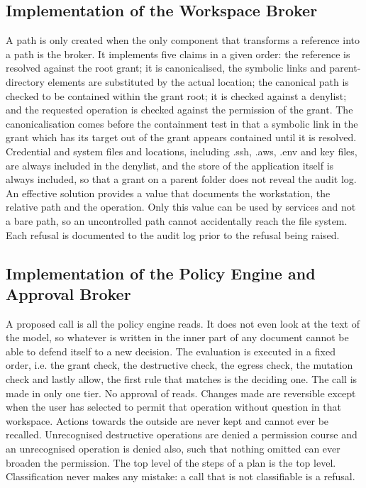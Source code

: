 \documentclass{FastFyp}
\begin{document}
\subsection{Implementation of the Workspace Broker}
A path is only created when the only component that transforms a reference into a path is the broker. It implements five claims in a given order: the reference is resolved against the root grant; it is canonicalised, the symbolic links and parent-directory elements are substituted by the actual location; the canonical path is checked to be contained within the grant root; it is checked against a denylist; and the requested operation is checked against the permission of the grant. The canonicalisation comes before the containment test in that a symbolic link in the grant which has its target out of the grant appears contained until it is resolved. Credential and system files and locations, including .ssh, .aws, .env and key files, are always included in the denylist, and the store of the application itself is always included, so that a grant on a parent folder does not reveal the audit log. An effective solution provides a value that documents the workstation, the relative path and the operation. Only this value can be used by services and not a bare path, so an uncontrolled path cannot accidentally reach the file system. Each refusal is documented to the audit log prior to the refusal being raised.


\subsection{Implementation of the Policy Engine and Approval Broker}
A proposed call is all the policy engine reads. It does not even look at the text of the model, so whatever is written in the inner part of any document cannot be able to defend itself to a new decision. The evaluation is executed in a fixed order, i.e. the grant check, the destructive check, the egress check, the mutation check and lastly allow, the first rule that matches is the deciding one. The call is made in only one tier. No approval of reads. Changes made are reversible except when the user has selected to permit that operation without question in that workspace. Actions towards the outside are never kept and cannot ever be recalled. Unrecognised destructive operations are denied a permission course and an unrecognised operation is denied also, such that nothing omitted can ever broaden the permission. The top level of the steps of a plan is the top level. Classification never makes any mistake: a call that is not classifiable is a refusal.
\end{document}
